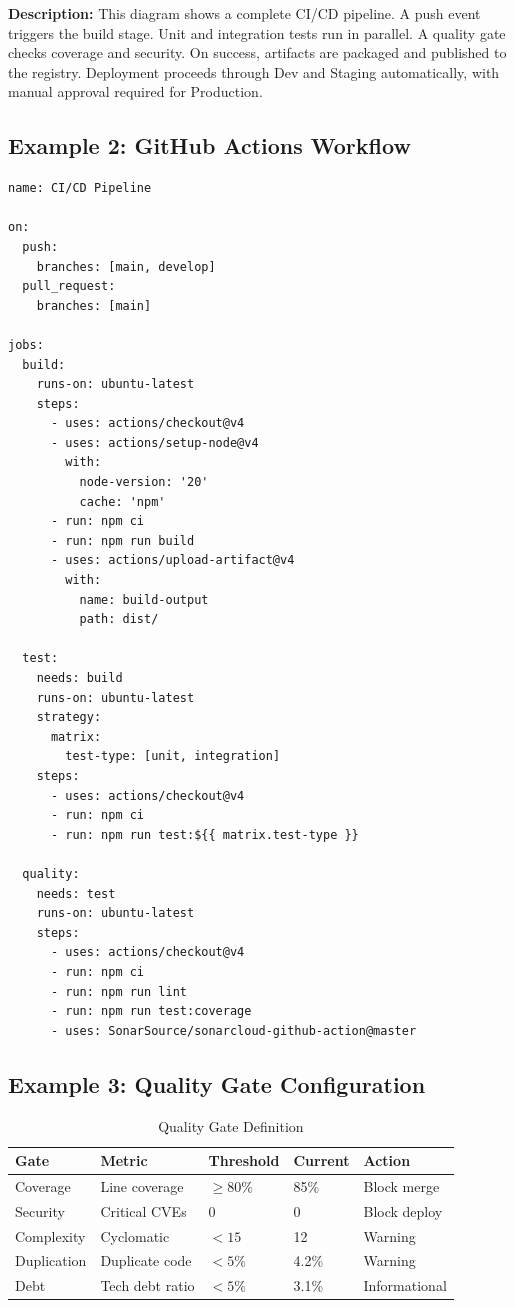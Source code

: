 \documentclass[11pt,letterpaper]{article}
\begin{document}
\textbf{Description:} This diagram shows a complete CI/CD pipeline. A push event triggers the build stage. Unit and integration tests run in parallel. A quality gate checks coverage and security. On success, artifacts are packaged and published to the registry. Deployment proceeds through Dev and Staging automatically, with manual approval required for Production.

\subsection{Example 2: GitHub Actions Workflow}

\begin{verbatim}
name: CI/CD Pipeline

on:
  push:
    branches: [main, develop]
  pull_request:
    branches: [main]

jobs:
  build:
    runs-on: ubuntu-latest
    steps:
      - uses: actions/checkout@v4
      - uses: actions/setup-node@v4
        with:
          node-version: '20'
          cache: 'npm'
      - run: npm ci
      - run: npm run build
      - uses: actions/upload-artifact@v4
        with:
          name: build-output
          path: dist/

  test:
    needs: build
    runs-on: ubuntu-latest
    strategy:
      matrix:
        test-type: [unit, integration]
    steps:
      - uses: actions/checkout@v4
      - run: npm ci
      - run: npm run test:${{ matrix.test-type }}

  quality:
    needs: test
    runs-on: ubuntu-latest
    steps:
      - uses: actions/checkout@v4
      - run: npm ci
      - run: npm run lint
      - run: npm run test:coverage
      - uses: SonarSource/sonarcloud-github-action@master
\end{verbatim}

\subsection{Example 3: Quality Gate Configuration}

\begin{table}[H]
\centering
\caption{Quality Gate Definition}
\small
\begin{tabular}{@{}L{2.5cm}L{2.5cm}C{2cm}C{2cm}L{2.5cm}@{}}
\toprule
\textbf{Gate} & \textbf{Metric} & \textbf{Threshold} & \textbf{Current} & \textbf{Action} \\
\midrule
Coverage & Line coverage & $\geq 80\%$ & 85\% & Block merge \\
\addlinespace
Security & Critical CVEs & 0 & 0 & Block deploy \\
\addlinespace
Complexity & Cyclomatic & $< 15$ & 12 & Warning \\
\addlinespace
Duplication & Duplicate code & $< 5\%$ & 4.2\% & Warning \\
\addlinespace
Debt & Tech debt ratio & $< 5\%$ & 3.1\% & Informational \\
\bottomrule
\end{tabular}
\end{table}
\end{document}
